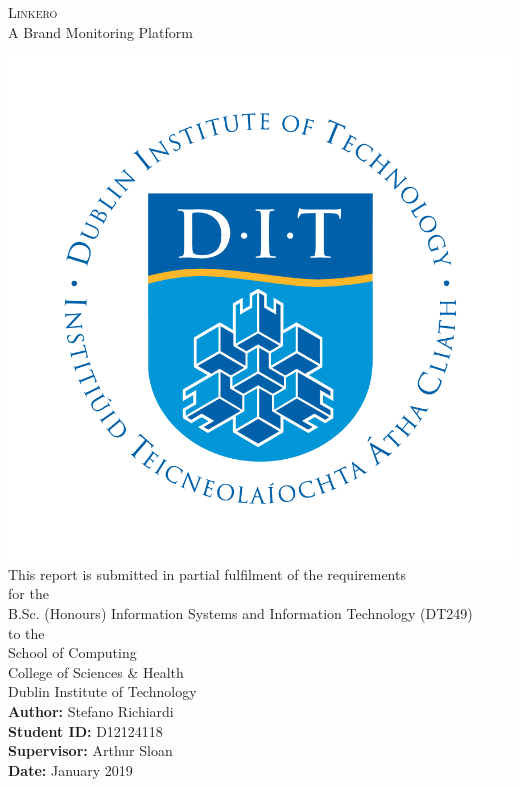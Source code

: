 \begin{titlepage}

\raggedleft
{\Huge\scshape Linkero\\[.2in]}
{\large A Brand Monitoring Platform\\[.2in]}

\includegraphics[scale=0.3]{DIT_logocol2013.png}\\[.2in]
\vfill
{\large This report is submitted in partial fulfilment of the requirements}
\\[.1in]
for the\\[.1in]
{\large B.Sc. (Honours) Information Systems and Information Technology
(DT249)}\\[.1in]
to the\\[.1in]
{\large School of Computing}\\[.05in]
{\large College of Sciences \& Health}\\[.05in]
{\large Dublin Institute of Technology}\\
\vfill
{\bfseries Author:} Stefano Richiardi\\
{\bfseries Student ID:} D12124118 \\
{\bfseries Supervisor:} Arthur Sloan\\
{\bfseries Date:} January 2019\\

\end{titlepage}